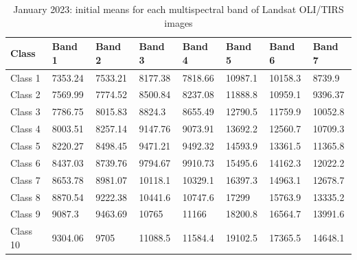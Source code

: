 \documentclass[geomatics,article,submit,pdftex,moreauthors]{Definitions/mdpi}
\begin{document}
\begin{table}[H]
\centering
\begin{tabularx}{\textwidth}{| p{1.5cm} | X | X | X | X | X | X | X | }
  \toprule
   Class & Band 1 & Band 2 & Band 3 & Band 4 & Band 5 & Band 6 & Band 7  \\
   \midrule
    Class 1 & 7353.24 & 7533.21 & 8177.38 & 7818.66 & 10987.1 & 10158.3 & 8739.9 \\
    Class 2 & 7569.99 & 7774.52 & 8500.84 & 8237.08 & 11888.8 & 10959.1 & 9396.37 \\
    Class 3 & 7786.75 & 8015.83 & 8824.3 & 8655.49 & 12790.5 & 11759.9 & 10052.8 \\
    Class 4 & 8003.51 & 8257.14 & 9147.76 & 9073.91 & 13692.2 & 12560.7 & 10709.3 \\
    Class 5 & 8220.27 & 8498.45 & 9471.21 & 9492.32 & 14593.9 & 13361.5 & 11365.8 \\
    Class 6 & 8437.03 & 8739.76 & 9794.67 & 9910.73 & 15495.6 & 14162.3 & 12022.2 \\
    Class 7 & 8653.78 & 8981.07 & 10118.1 & 10329.1 & 16397.3 & 14963.1 & 12678.7 \\
    Class 8 & 8870.54 & 9222.38 & 10441.6 & 10747.6 & 17299 & 15763.9 & 13335.2 \\
    Class 9 & 9087.3 & 9463.69 & 10765 & 11166 & 18200.8 & 16564.7 & 13991.6 \\
    Class 10 & 9304.06 & 9705 & 11088.5 & 11584.4 & 19102.5 & 17365.5 & 14648.1 \\
    \bottomrule
\end{tabularx}
\caption{January 2023: initial means for each multispectral band of Landsat OLI/TIRS images}\label{tabA01}
\end{table}
\end{document}

